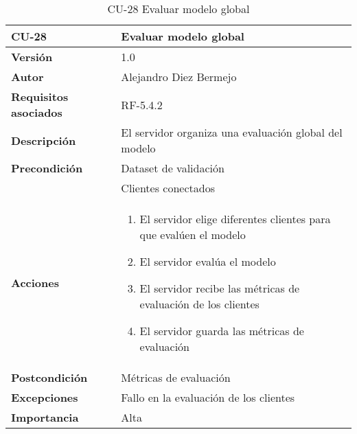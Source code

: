 \begin{table}[p]
	\centering
	\begin{tabularx}{\linewidth}{ p{} p{} }
		\toprule
		\textbf{CU-28}    & \textbf{Evaluar modelo global}\\
		\toprule
		\textbf{Versión}              & 1.0    \\
		\textbf{Autor}                & Alejandro Diez Bermejo \\
		\textbf{Requisitos asociados} & RF-5.4.2 \\
		\textbf{Descripción}          & El servidor organiza una evaluación global del modelo \\
        \textbf{Precondición}         & Dataset de validación \\
                                      & Clientes conectados \\
		\textbf{Acciones}             &
		\begin{enumerate}
			\def\labelenumi{\arabic{enumi}.}
			\tightlist
            \item El servidor elige diferentes clientes para que evalúen el modelo
            \item El servidor evalúa el modelo
            \item El servidor recibe las métricas de evaluación de los clientes
            \item El servidor guarda las métricas de evaluación
		\end{enumerate}\\
		\textbf{Postcondición}        & Métricas de evaluación \\
		\textbf{Excepciones}          & Fallo en la evaluación de los clientes \\
		\textbf{Importancia}          & Alta \\
		\bottomrule
	\end{tabularx}
	\caption{CU-28 Evaluar modelo global}
\end{table}

